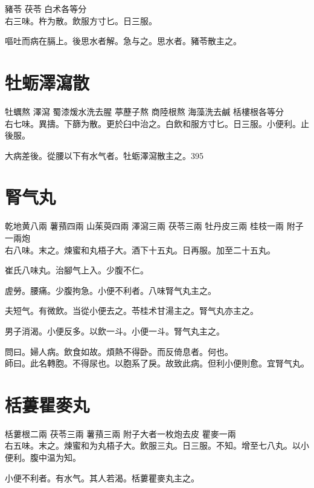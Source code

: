 豬苓 茯苓 白术{\scriptsize 各等分}\\
右三味。杵为散。飲服方寸匕。日三服。

嘔吐而病在膈上。後思水者解。急与之。思水者。豬苓散主之。

\section{牡蛎澤瀉散}

牡蠣{\scriptsize 熬} 澤瀉 蜀漆{\scriptsize 煖水洗去腥} 葶藶子{\scriptsize 熬} 商陸根{\scriptsize 熬} 海藻{\scriptsize 洗去鹹} 栝樓根{\scriptsize 各等分}\\
右七味。異擣。下篩为散。更於臼中治之。白飲和服方寸匕。日三服。小便利。止後服。

大病差後。從腰以下有水气者。牡蛎澤瀉散主之。395

\section{腎气丸}

乾地黄{\scriptsize 八兩} 薯蕷{\scriptsize 四兩} 山茱萸{\scriptsize 四兩} 澤瀉{\scriptsize 三兩} 茯苓{\scriptsize 三兩} 牡丹皮{\scriptsize 三兩} 桂枝{\scriptsize 一兩} 附子{\scriptsize 一兩炮}\\
右八味。末之。煉蜜和丸梧子大。酒下十五丸。日再服。{\khaaitp 加至二十五丸。}

崔氏八味丸。治腳气上入。少腹不仁。

虗勞。腰痛。少腹拘急。小便不利者。八味腎气丸主之。

夫短气。有微飲。当從小便去之。苓桂术甘湯主之。腎气丸亦主之。

男子消渴。小便反多。以飲一斗。小便一斗。腎气丸主之。

問曰。婦人病。飲食如故。煩熱不得卧。而反倚息者。何也。\\
師曰。此名轉胞。不得尿也。以胞系了戾。故致此病。但利小便則愈。宜腎气丸。

\section{栝蔞瞿麥丸}

栝蔞根{\scriptsize 二兩} 茯苓{\scriptsize 三兩} 薯蕷{\scriptsize 三兩} 附子{\scriptsize 大者一枚炮去皮} 瞿麥{\scriptsize 一兩}\\
右五味。末之。煉蜜和为丸梧子大。飲服三丸。日三服。不知。增至七八丸。以小便利。腹中温为知。

小便不利者。有水气。其人若渴。栝蔞瞿麥丸主之。

